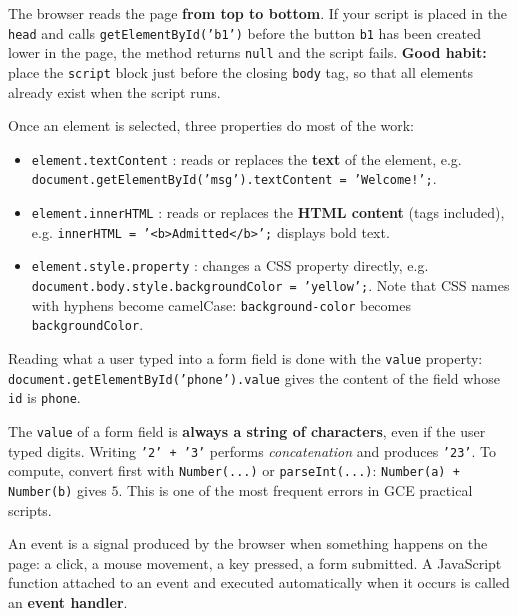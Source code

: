 \documentclass[11pt]{article}
\newcommand{\cle}[1]{{\popxbold\color{popdark}#1}}
\newcounter{popsec}
\newcounter{popsub}
\newcommand{\courssub}[1]{%
  \stepcounter{popsub}%
  \par\vspace{9pt}\noindent{\popxbold\fontsize{11.5}{13}\selectfont\color{popink}{\color{poporange}\thepopsec.\thepopsub}\hspace{6pt}#1}\par\nopagebreak\vspace{4pt}
}
\begin{document}
\begin{attention}
The browser reads the page \textbf{from top to bottom}. If your script is placed in the \texttt{head} and calls \texttt{getElementById('b1')} before the button \texttt{b1} has been created lower in the page, the method returns \texttt{null} and the script fails. \textbf{Good habit:} place the \texttt{script} block just before the closing \texttt{body} tag, so that all elements already exist when the script runs.
\end{attention}

Once an element is selected, three properties do most of the work:

\begin{itemize}
\item \texttt{element.textContent} : reads or replaces the \textbf{text} of the element, e.g. \texttt{document.getElementById('msg').textContent = 'Welcome!';}.
\item \texttt{element.innerHTML} : reads or replaces the \textbf{HTML content} (tags included), e.g. \texttt{innerHTML = '<b>Admitted</b>';} displays bold text.
\item \texttt{element.style.property} : changes a CSS property directly, e.g. \texttt{document.body.style.backgroundColor = 'yellow';}. Note that CSS names with hyphens become camelCase: \texttt{background-color} becomes \texttt{backgroundColor}.
\end{itemize}

Reading what a user typed into a form field is done with the \texttt{value} property: \texttt{document.getElementById('phone').value} gives the content of the field whose \texttt{id} is \texttt{phone}.

\begin{attention}
The \texttt{value} of a form field is \textbf{always a string of characters}, even if the user typed digits. Writing \texttt{'2' + '3'} performs \emph{concatenation} and produces \texttt{'23'}. To compute, convert first with \texttt{Number(...)} or \texttt{parseInt(...)}: \texttt{Number(a) + Number(b)} gives $5$. This is one of the most frequent errors in GCE practical scripts.
\end{attention}

\courssub{Events: Making the Page React}

\begin{definition}[Event]
An \cle{event} is a signal produced by the browser when something happens on the page: a click, a mouse movement, a key pressed, a form submitted. A JavaScript function attached to an event and executed automatically when it occurs is called an \textbf{event handler}.
\end{definition}
\end{document}
